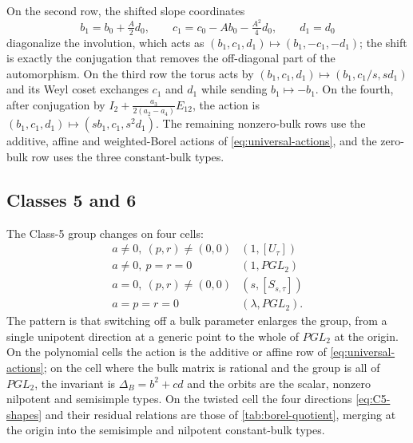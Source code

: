 \documentclass[11pt,reqno]{amsart}
\theoremstyle{plain}
\theoremstyle{definition}
\theoremstyle{remark}
\numberwithin{equation}{section}
\newcommand{\Id}{I_2}
\begin{document}
On the second row, the shifted slope coordinates
\begin{equation}
b_1=b_0+\tfrac{A}{2}d_0,\qquad
c_1=c_0-Ab_0-\tfrac{A^2}{4}d_0,\qquad d_1=d_0
\label{eq:C4-shift}
\end{equation}
diagonalize the involution, which acts as $(b_1,c_1,d_1)\mapsto(b_1,-c_1,-d_1)$;
the shift is exactly the conjugation that removes the off-diagonal part of the
automorphism. On the third row the torus acts by
$(b_1,c_1,d_1)\mapsto(b_1,c_1/s,sd_1)$ and its Weyl coset exchanges $c_1$ and
$d_1$ while sending $b_1\mapsto-b_1$. On the fourth, after conjugation by
$\Id+\frac{a_3}{2(a_2-a_4)}E_{12}$, the action is
$(b_1,c_1,d_1)\mapsto(sb_1,c_1,s^2d_1)$. The remaining nonzero-bulk rows use the
additive, affine and weighted-Borel actions of \cref{eq:universal-actions}, and
the zero-bulk row uses the three constant-bulk types.

\subsection{Classes 5 and 6}

The Class-5 group changes on four cells:
\begin{equation}
\begin{array}{c|c}
a\ne0,\ (p,r)\ne(0,0)&(1,[U_\tau])\\
a\ne0,\ p=r=0&(1,PGL_2)\\
a=0,\ (p,r)\ne(0,0)&(s,[S_{s,\tau}])\\
a=p=r=0&(\lambda,PGL_2).
\end{array}                                           \label{eq:C5-aut}
\end{equation}
The pattern is that switching off a bulk parameter enlarges the group, from a
single unipotent direction at a generic point to the whole of $PGL_2$ at the
origin. On the polynomial cells the action is the additive or affine row of
\cref{eq:universal-actions}; on the cell where the bulk matrix is rational and
the group is all of $PGL_2$, the invariant is $\Delta_B=b^2+cd$ and the orbits
are the scalar, nonzero nilpotent and semisimple types. On the twisted cell the
four directions \cref{eq:C5-shapes} and their residual relations are those of
\cref{tab:borel-quotient}, merging at the origin into the semisimple and
nilpotent constant-bulk types.
\end{document}
